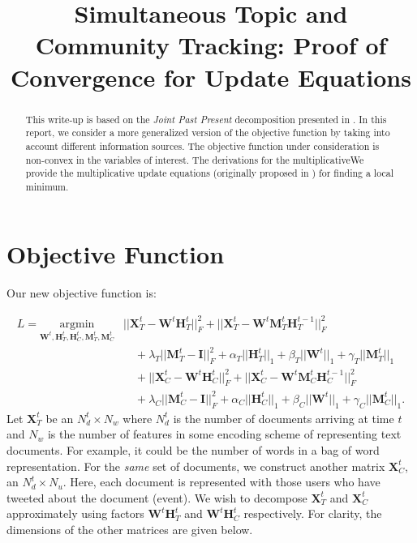 \documentclass[a4paper,10pt]{article}
\newcommand{\I}{\mathcal{I}}
\newcommand{\W}{\textbf{W}^t}
\newcommand{\HT}{\textbf{H}^t_T}
\newcommand{\HC}{\textbf{H}^t_C}
\newcommand{\MT}{\textbf{M}^t_T}
\newcommand{\MC}{\textbf{M}^t_C}
\newcommand{\HTtt}{\textbf{H}^{t-1}_T}
\newcommand{\HCtt}{\textbf{H}^{t-1}_C}
\newcommand{\XT}{\textbf{X}^t_T}
\newcommand{\XC}{\textbf{X}^t_C}
\renewcommand{\I}{\textbf{I}}
\newcommand{\0}{\textbf{0}}
\begin{document}
\title{Simultaneous Topic and Community Tracking: Proof of Convergence for Update Equations}
\date{}
\maketitle

\begin{abstract}
This write-up is based on the \emph{Joint Past Present} decomposition presented
in \cite{vaca_2014}.  In this report, we consider a more
generalized version of the objective function by taking into account different
information sources.  The objective function under consideration
is non-convex in the variables of interest.  The derivations for the multiplicativeWe provide the multiplicative 
update equations (originally proposed in \cite{lee_1999}) for finding a local minimum.
\end{abstract}

\section{Objective Function}

Our new objective function is:

\begin{equation}
\begin{split}
L =  \underset{\W,\HT,\HC,\MT,\MC} {\mathrm{argmin}} & ||\XT - \W\HT||^2_F + ||\XT - \W\MT\HTtt||^2_F \\
	&\quad + \lambda_T ||\MT - \I||^2_F + \alpha_T||\HT ||_1 + \beta_T|| \W||_1 + \gamma_T||\MT ||_1 \\
	&\quad +  ||\XC - \W\HC||^2_F + ||\XC - \W\MC\HCtt||^2_F \\
	&\quad + \lambda_C ||\MC - \I||^2_F + \alpha_C||\HC ||_1 + \beta_C|| \W||_1 + \gamma_C||\MC ||_1.
\end{split}
\label{eq:objective}
\end{equation}
Let $\XT$ be an $N_d^t \times N_w$ where $N_d^t$ is the number of documents arriving at time $t$ and
$N_w$ is the number of features in some encoding scheme of representing text documents.  For example,
it could be the number of words in a bag of word representation.  
For the \emph{same} set of documents, we construct another matrix
$\XC$, an $N_d^t \times N_u$.  Here, each document is represented with those users who have tweeted
about the document (event).  We wish to decompose $\XT$ and $\XC$ approximately using factors $\W\HT$ and
$\W\HC$ respectively.  For clarity, the dimensions of the other matrices are given below.
\end{document}
